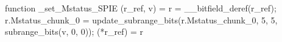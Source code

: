 function _set_Mstatus_SPIE (r_ref, v) = {
    r = __bitfield_deref(r_ref);
    r.Mstatus_chunk_0 = update_subrange_bits(r.Mstatus_chunk_0, 5, 5, subrange_bits(v, 0, 0));
    (*r_ref) = r
}
